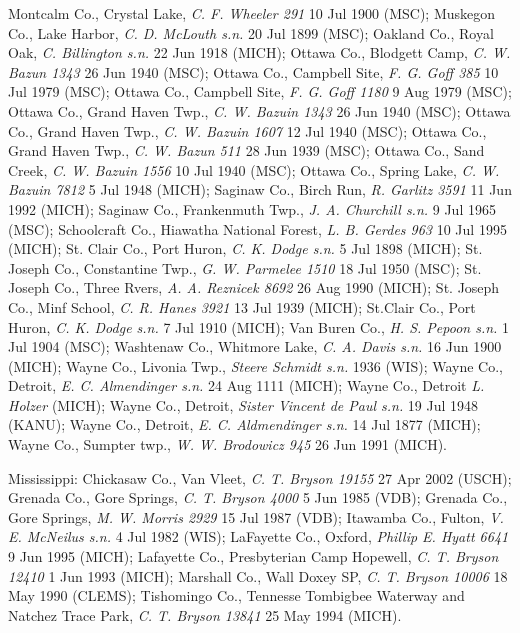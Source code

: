 \documentclass{article}
\begin{document}
Montcalm Co., Crystal Lake, \textit{C. F. Wheeler 291} 10 Jul 1900 (MSC);
Muskegon Co., Lake Harbor, \textit{C. D. McLouth s.n.} 20 Jul 1899 (MSC);
Oakland Co., Royal Oak, \textit{C. Billington s.n.} 22 Jun 1918 (MICH);
Ottawa Co., Blodgett Camp, \textit{C. W. Bazun 1343} 26 Jun 1940 (MSC);
Ottawa Co., Campbell Site, \textit{F. G. Goff 385} 10 Jul 1979 (MSC);
Ottawa Co., Campbell Site, \textit{F. G. Goff 1180} 9 Aug 1979 (MSC);
Ottawa Co., Grand Haven Twp., \textit{C. W. Bazuin 1343} 26 Jun 1940 (MSC);
Ottawa Co., Grand Haven Twp., \textit{C. W. Bazuin 1607} 12 Jul 1940 (MSC);
Ottawa Co., Grand Haven Twp., \textit{C. W. Bazun 511} 28 Jun 1939 (MSC);
Ottawa Co., Sand Creek, \textit{C. W. Bazuin 1556} 10 Jul 1940 (MSC);
Ottawa Co., Spring Lake, \textit{C. W. Bazuin 7812} 5 Jul 1948 (MICH);
Saginaw Co., Birch Run, \textit{R. Garlitz 3591} 11 Jun 1992 (MICH);
Saginaw Co., Frankenmuth Twp., \textit{J. A. Churchill s.n.} 9 Jul 1965 (MSC);
Schoolcraft Co., Hiawatha National Forest, \textit{L. B. Gerdes 963} 10 Jul 1995 (MICH);
St. Clair Co., Port Huron, \textit{C. K. Dodge s.n.} 5 Jul 1898 (MICH);
St. Joseph Co., Constantine Twp., \textit{G. W. Parmelee 1510} 18 Jul 1950 (MSC);
St. Joseph Co., Three Rvers, \textit{A. A. Reznicek 8692} 26 Aug 1990 (MICH);
St. Joseph Co., Minf School, \textit{C. R. Hanes 3921} 13 Jul 1939 (MICH);
St.Clair Co., Port Huron, \textit{C. K. Dodge s.n.} 7 Jul 1910 (MICH);
Van Buren Co., \textit{H. S. Pepoon s.n.} 1 Jul 1904 (MSC);
Washtenaw Co., Whitmore Lake, \textit{C. A. Davis s.n.} 16 Jun 1900 (MICH);
Wayne Co., Livonia Twp., \textit{Steere Schmidt s.n.} 1936 (WIS);
Wayne Co., Detroit, \textit{E. C. Almendinger s.n.} 24 Aug 1111 (MICH);
Wayne Co., Detroit \textit{L. Holzer} (MICH);
Wayne Co., Detroit, \textit{ Sister Vincent de Paul s.n.} 19 Jul 1948 (KANU);
Wayne Co., Detroit, \textit{E. C. Aldmendinger s.n.} 14 Jul 1877 (MICH);
Wayne Co., Sumpter twp., \textit{W. W. Brodowicz 945} 26 Jun 1991 (MICH).

Mississippi:
Chickasaw Co., Van Vleet, \textit{C. T. Bryson 19155} 27 Apr 2002 (USCH);
Grenada Co., Gore Springs, \textit{C. T. Bryson 4000} 5 Jun 1985 (VDB);
Grenada Co., Gore Springs, \textit{M. W. Morris 2929} 15 Jul 1987 (VDB);
Itawamba Co., Fulton, \textit{V. E. McNeilus s.n.} 4 Jul 1982 (WIS);
LaFayette Co., Oxford, \textit{Phillip E. Hyatt 6641} 9 Jun 1995 (MICH);
Lafayette Co., Presbyterian Camp Hopewell, \textit{C. T. Bryson 12410} 1 Jun 1993 (MICH);
Marshall Co., Wall Doxey SP, \textit{C. T. Bryson 10006} 18 May 1990 (CLEMS);
Tishomingo Co., Tennesse Tombigbee Waterway and Natchez Trace Park, \textit{C. T. Bryson 13841} 25 May 1994 (MICH).
\end{document}
